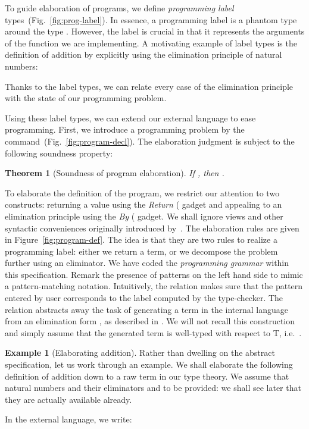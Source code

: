 \documentclass{scrartcl}
\theoremstyle{plain}
\newtheorem{theorem}{Theorem}
\theoremstyle{definition}
\newtheorem{example}{Example}
\newcommand{\ie}{i.e.\ }
\begin{document}
To guide elaboration of programs, we define \emph{programming label}
types~(Fig.~\ref{fig:prog-label}). In essence, a programming label
 is a phantom type around the type . However,
the label  is crucial in that it represents the arguments of the
function we are implementing. A motivating example of label types is
the definition of addition by explicitly using the elimination
principle of natural numbers:

Thanks to the label types, we can relate every case of the elimination
principle with the state of our programming problem. 







Using these label types, we can extend our external language to ease
programming. First, we introduce a programming problem by the
 command~(Fig.~\ref{fig:program-decl}). The elaboration
judgment is subject to the following soundness property:
\begin{theorem}[Soundness of program elaboration]
If , 
then .
\end{theorem}

To elaborate the definition of the program, we restrict our attention
to two constructs: returning a value using the \emph{Return}
( gadget and appealing to an elimination principle using
the \emph{By} ( gadget. We shall ignore views and other
syntactic conveniences originally introduced
by~\citet{mcbride.mckinna:view-from-the-left}. The elaboration rules
are given in Figure~\ref{fig:program-def}. The idea is that they are
two rules to realize a programming label: either we return a term, or
we decompose the problem further using an eliminator. We have coded
the \emph{programming grammar} within this specification. Remark the
presence of patterns  on the left hand side to mimic a
pattern-matching notation. Intuitively, the relation
 makes sure that the pattern entered by user
corresponds to the label computed by the type-checker. The relation
 abstracts away the task of generating a
term  in the internal language from an elimination form ,
as described in \citet{mcbride:elim-2,mcbride:elim}. We will not
recall this construction and simply assume that the generated term is
well-typed with respect to T, \ie .




\begin{example}[Elaborating addition]

Rather than dwelling on the abstract specification, let us work
through an example. We shall elaborate the following definition of
addition down to a raw term in our type theory. We assume that natural
numbers and their eliminators  and  to be
provided: we shall see later that they are actually available already.

In the external language, we write:



\end{example}
\end{document}
